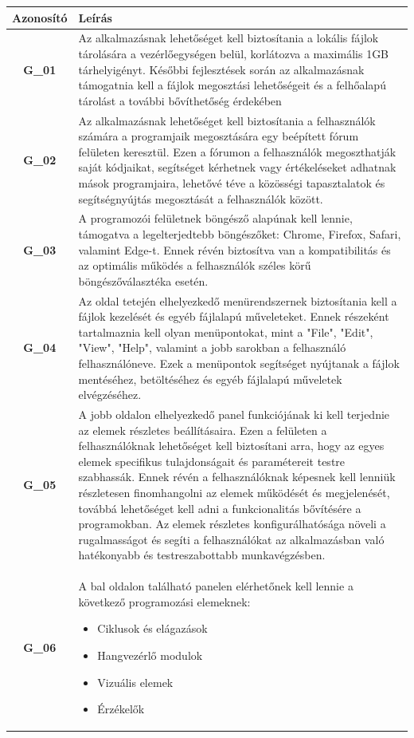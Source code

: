 \documentclass{article}
\begin{document}
\begingroup
\centering
\begin{longtable}{|c|p{14cm}|}
\hline
\textbf{Azonosító} & \textbf{Leírás}        \\ 
\hline
\textbf{G\_01} & Az alkalmazásnak lehetőséget kell biztosítania a lokális fájlok tárolására a vezérlőegységen belül, korlátozva a maximális 1GB tárhelyigényt. Későbbi fejlesztések során az alkalmazásnak támogatnia kell a fájlok megosztási lehetőségeit és a felhőalapú tárolást a további bővíthetőség érdekében \\\hline
\textbf{G\_02} & Az alkalmazásnak lehetőséget kell biztosítania a felhasználók számára a programjaik megosztására egy beépített fórum felületen keresztül. Ezen a fórumon a felhasználók megoszthatják saját kódjaikat, segítséget kérhetnek vagy értékeléseket adhatnak mások programjaira, lehetővé téve a közösségi tapasztalatok és segítségnyújtás megosztását a felhasználók között. \\\hline
\textbf{G\_03} & A programozói felületnek böngésző alapúnak kell lennie, támogatva a legelterjedtebb böngészőket: Chrome, Firefox, Safari, valamint Edge-t. Ennek révén biztosítva van a kompatibilitás és az optimális működés a felhasználók széles körű böngészőválasztéka esetén.\\\hline
\textbf{G\_04} & Az oldal tetején elhelyezkedő menürendszernek biztosítania kell a fájlok kezelését és egyéb fájlalapú műveleteket. Ennek részeként tartalmaznia kell olyan menüpontokat, mint a "File", "Edit", "View", "Help", valamint a jobb sarokban a felhasználó felhasználóneve. Ezek a menüpontok segítséget nyújtanak a fájlok mentéséhez, betöltéséhez és egyéb fájlalapú műveletek elvégzéséhez. \\\hline
\textbf{G\_05} & A jobb oldalon elhelyezkedő panel funkciójának ki kell terjednie az elemek részletes beállításaira. Ezen a felületen a felhasználóknak lehetőséget kell biztosítani arra, hogy az egyes elemek specifikus tulajdonságait és paramétereit testre szabhassák. Ennek révén a felhasználóknak képesnek kell lenniük részletesen finomhangolni az elemek működését és megjelenését, továbbá lehetőséget kell adni a funkcionalitás bővítésére a programokban. Az elemek részletes konfigurálhatósága növeli a rugalmasságot és segíti a felhasználókat az alkalmazásban való hatékonyabb és testreszabottabb munkavégzésben. \\\hline
\textbf{G\_06} & A bal oldalon található panelen elérhetőnek kell lennie a következő programozási elemeknek:
\begin{itemize}
    \item Ciklusok és elágazások
    \item Hangvezérlő modulok
    \item Vizuális elemek
    \item Érzékelők
\end{itemize}


\end{longtable}
\end{document}
